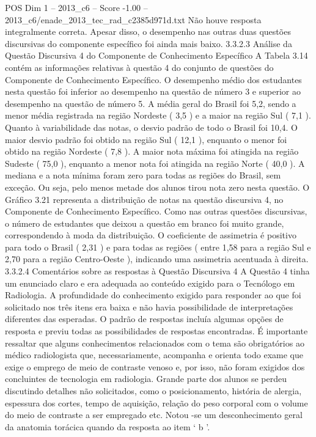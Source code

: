 \begin{textsample}{POS Dim 1 – 2013\_c6 – Score -1.00 – 2013\_c6/enade\_2013\_tec\_rad\_c2385d971d.txt}
Não houve resposta integralmente correta.
Apesar disso, o desempenho nas outras duas questões discursivas do componente específico foi ainda mais baixo. 3.3.2.3 Análise da Questão Discursiva 4 do Componente de Conhecimento Específico A Tabela 3.14 contém as informações relativas à questão 4 do conjunto de questões do Componente de Conhecimento Específico.
O desempenho médio dos estudantes nesta questão foi inferior ao desempenho na questão de número 3 e superior ao desempenho na questão de número 5.
A média geral do Brasil foi 5,2, sendo a menor média registrada na região Nordeste ( 3,5 ) e a maior na região Sul ( 7,1 ).
Quanto à variabilidade das notas, o desvio padrão de todo o Brasil foi 10,4.
O maior desvio padrão foi obtido na região Sul ( 12,1 ), enquanto o menor foi obtido na região Nordeste ( 7,8 ).
A maior nota máxima foi atingida na região Sudeste ( 75,0 ), enquanto a menor nota foi atingida na região Norte ( 40,0 ).
A mediana e a nota mínima foram zero para todas as regiões do Brasil, sem exceção.
Ou seja, pelo menos metade dos alunos tirou nota zero nesta questão.
O Gráfico 3.21 representa a distribuição de notas na questão discursiva 4, no Componente de Conhecimento Específico.
Como nas outras questões discursivas, o número de estudantes que deixou a questão em branco foi muito grande, correspondendo à moda da distribuição.
O coeficiente de assimetria é positivo para todo o Brasil ( 2,31 ) e para todas as regiões ( entre 1,58 para a região Sul e 2,70 para a região Centro-Oeste ), indicando uma assimetria acentuada à direita. 3.3.2.4 Comentários sobre as respostas à Questão Discursiva 4 A Questão 4 tinha um enunciado claro e era adequada ao conteúdo exigido para o Tecnólogo em Radiologia.
A profundidade do conhecimento exigido para responder ao que foi solicitado nos três itens era baixa e não havia possibilidade de interpretações diferentes das esperadas.
O padrão de respostas incluía algumas opções de resposta e previu todas as possibilidades de respostas encontradas.
É importante ressaltar que alguns conhecimentos relacionados com o tema são obrigatórios ao médico radiologista que, necessariamente, acompanha e orienta todo exame que exige o emprego de meio de contraste venoso e, por isso, não foram exigidos dos concluintes de tecnologia em radiologia.
Grande parte dos alunos se perdeu discutindo detalhes não solicitados, como o posicionamento, história de alergia, espessura dos cortes, tempo de aquisição, relação do peso corporal com o volume do meio de contraste a ser empregado etc.
Notou -se um desconhecimento geral da anatomia torácica quando da resposta ao item ‘ b ’.

\end{textsample}
